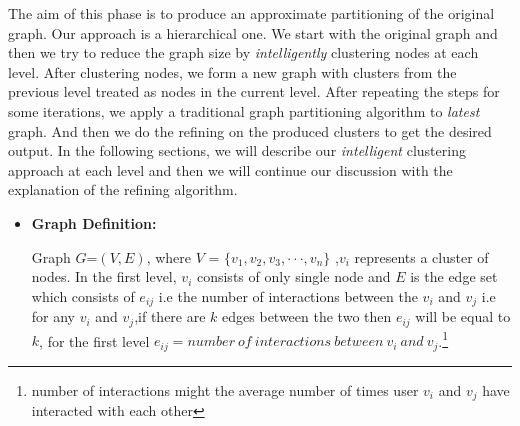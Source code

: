 \documentclass[letterpaper]{article}
\begin{document}
The aim of this phase is to produce an approximate partitioning of the original
graph. Our approach is a hierarchical one.  We start with the original graph
and then we try to reduce the graph size by \emph{intelligently} clustering
nodes at each level. After clustering nodes, we form a new graph with clusters
from the previous level treated as nodes in the current level. After repeating
the steps for some iterations, we apply a traditional graph partitioning
algorithm to \emph{latest} graph. And then we do the refining on the produced
clusters to get the desired output. In the following sections, we will describe
our \emph{intelligent} clustering approach at each level and then we will
continue our discussion with the explanation of the refining algorithm.
\begin{itemize} %

\item \textbf{Graph Definition:}

Graph  $G$=$(V,E)$, where $V$ = $\{v_1,v_2,v_3,\cdot\cdot\cdot,v_n\}$ ,$v_i$ represents a cluster of nodes. 
In the first level, $v_i$ consists of only single node and $E$ is the edge set which consists of $e_{ij}$ i.e the number of interactions between the $v_i$ and $v_j$ i.e for any $v_i$ and $v_j$,if there are $k$ edges between 
the two then $e_{ij}$ will be equal to $k$, for the first level $e_{ij}=number\ of\ interactions\ between\ v_i\ and\ v_j$.\footnote{number of interactions might the average number of times user $v_i$ and $v_j$ have interacted
with each other} 

\end{itemize} %
\end{document}
